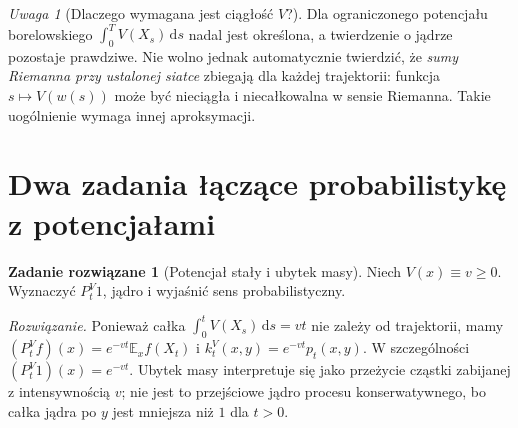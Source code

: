 \documentclass[11pt,a4paper,oneside]{report}
\numberwithin{equation}{chapter}
\theoremstyle{plain}
\theoremstyle{definition}
\newtheorem{zadanie}{Zadanie rozwiązane}[chapter]
\theoremstyle{remark}
\newtheorem{uwaga}{Uwaga}[chapter]
\newcommand{\E}{\mathbb{E}}
\newcommand{\dd}{\mathrm{d}}
\begin{document}
\begin{uwaga}[Dlaczego wymagana jest ciągłość $V$?]
Dla ograniczonego potencjału borelowskiego
$\int_0^TV(X_s)\,\dd s$ nadal jest określona,
a twierdzenie o jądrze pozostaje prawdziwe.
Nie wolno jednak automatycznie twierdzić, że \emph{sumy
Riemanna przy ustalonej siatce} zbiegają dla każdej
trajektorii: funkcja $s\mapsto V(w(s))$ może być
nieciągła i niecałkowalna w sensie Riemanna.
Takie uogólnienie wymaga innej aproksymacji.
\end{uwaga}

\begin{center}
\end{center}

\section{Dwa zadania łączące probabilistykę z potencjałami}

\begin{zadanie}[Potencjał stały i ubytek masy]
Niech $V(x)\equiv v\ge0$. Wyznaczyć $P_t^V1$,
jądro i wyjaśnić sens probabilistyczny.

\emph{Rozwiązanie.} Ponieważ całka $\int_0^t V(X_s)\,\dd s=vt$
nie zależy od trajektorii, mamy
$(P_t^Vf)(x)=e^{-vt}\E_xf(X_t)$ i
$k_t^V(x,y)=e^{-vt}p_t(x,y)$. W szczególności
$(P_t^V1)(x)=e^{-vt}$. Ubytek masy interpretuje się
jako przeżycie cząstki zabijanej z intensywnością $v$;
nie jest to przejściowe jądro procesu konserwatywnego,
bo całka jądra po $y$ jest mniejsza niż $1$ dla $t>0$.
\end{zadanie}
\end{document}
